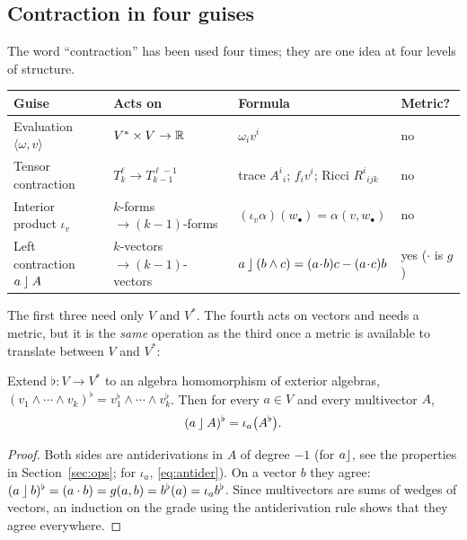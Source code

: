 \subsection{Contraction in four guises}\label{sec:contr4}

The word ``contraction'' has been used four times; they are one idea at four levels of structure.

\begin{center}
\small
\renewcommand{\arraystretch}{1.35}
\begin{tabular}{@{}p{3.4cm}p{3.5cm}p{4.2cm}p{2.2cm}@{}}
\toprule
\textbf{Guise} & \textbf{Acts on} & \textbf{Formula} & \textbf{Metric?}\\
\midrule
Evaluation $\langle\omega,v\rangle$ & $V^*\times V\to\mathbb{R}$ & $\omega_iv^i$ & no\\
Tensor contraction & $T^{\ell}_{k}\to T^{\ell-1}_{k-1}$ & trace $A^i{}_i$; $f_iv^i$; Ricci $R^i{}_{ijk}$ & no\\
Interior product $\iota_v$ & $k$-forms $\to(k-1)$-forms & $(\iota_v\alpha)(w_\bullet)=\alpha(v,w_\bullet)$ & no\\
Left contraction $a\mathbin{\rfloor} A$ & $k$-vectors $\to(k-1)$-vectors & $a\mathbin{\rfloor}(b\wedge c)=(a\!\cdot\! b)c-(a\!\cdot\! c)b$ & yes ($\cdot$ is $g$)\\
\bottomrule
\end{tabular}
\end{center}

The first three need only $V$ and $V^*$. The fourth acts on vectors and needs a metric, but it is the \emph{same} operation as the third once a
metric is available to translate between $V$ and $V^*$:

\begin{proposition}[left contraction $=$ interior product under $\flat$]\label{prop:lcisiota}
Extend $\flat:V\to V^*$ to an algebra homomorphism of exterior algebras, $(v_1\wedge\cdots\wedge v_k)^\flat=v_1^\flat\wedge\cdots\wedge v_k^\flat$. Then for every $a\in V$
and every multivector $A$,
\[
(a\mathbin{\rfloor} A)^\flat=\iota_a\bigl(A^\flat\bigr).
\]
\end{proposition}
\begin{proof}
Both sides are antiderivations in $A$ of degree $-1$ (for $a\mathbin{\rfloor}$, see the properties in Section~\ref{sec:ops}; for $\iota_a$, \eqref{eq:antider}). On a vector $b$ they agree:
$(a\mathbin{\rfloor} b)^\flat=(a\cdot b)=g(a,b)=b^\flat(a)=\iota_a b^\flat$. Since multivectors are sums of wedges of vectors, an induction on the grade using the antiderivation rule shows that they agree everywhere.
\end{proof}

